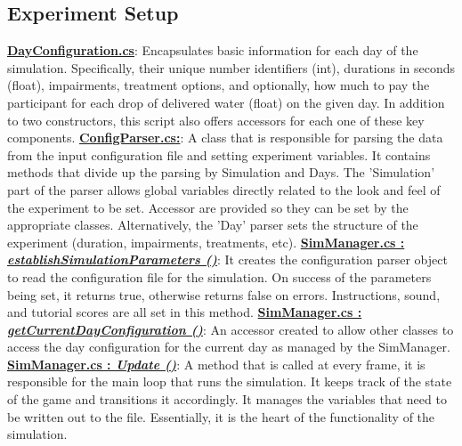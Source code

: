 \documentclass{article}
\begin{document}
\subsection{Experiment Setup} %
\href{https://bit.ly/2FvRTWR}{\textbf{DayConfiguration.cs}}: Encapsulates basic information for each day of the simulation. Specifically, their unique number identifiers (int), durations in seconds (float), impairments, treatment options, and optionally, how much to pay the participant for each drop of delivered water (float) on the given day. In addition to two constructors, this script also offers accessors for each one of these key components. \newline \newline
\href{https://bit.ly/2TZaLYj}{\textbf{ConfigParser.cs:}}: A class that is responsible for parsing the data from the input configuration file and setting experiment variables. It contains methods that divide up the parsing by Simulation and Days. The 'Simulation' part of the parser allows global variables directly related to the look and feel of the experiment to be set. Accessor are provided so they can be set by the appropriate classes. Alternatively, the 'Day' parser sets the structure of the experiment (duration, impairments, treatments, etc). 
\newline \newline
\href{https://bit.ly/2UhmSzq}{\textbf{SimManager.cs : \textit{establishSimulationParameters ()}}}: It creates the configuration parser object to read the configuration file for the simulation. On success of the parameters being set, it returns true, otherwise returns false on errors. Instructions, sound, and tutorial scores are all set in this method. \newline \newline
\href{https://bit.ly/2UhmSzq}{\textbf{SimManager.cs : \textit{getCurrentDayConfiguration ()}}}: An accessor created to allow other classes to access the day configuration for the current day as managed by the SimManager. \newline \newline
\href{https://bit.ly/2UhmSzq}{\textbf{SimManager.cs : \textit{Update ()}}}: A method that is called at every frame, it is responsible for the main loop that runs the simulation. It keeps track of the state of the game and transitions it accordingly. It manages the variables that need to be written out to the file. Essentially, it is the heart of the functionality of the simulation.
\end{document}
